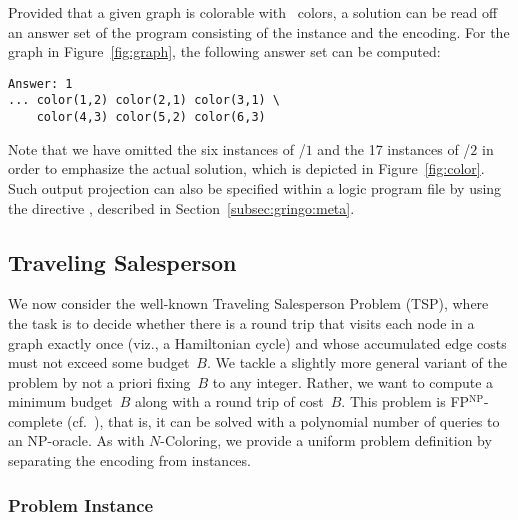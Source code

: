 Provided that a given graph is colorable with~ colors,
a solution can be read off an answer set of the program consisting
of the instance and the encoding.
For the graph in Figure~\ref{fig:graph},
the following answer set can be computed:%
%
\begin{lstlisting}[numbers=none]
Answer: 1
... color(1,2) color(2,1) color(3,1) \
    color(4,3) color(5,2) color(6,3)
\end{lstlisting}
%
Note that we have omitted the six instances of /$1$ and the
17 instances of \pred{edge}/$2$ in order to emphasize the actual solution,
which is depicted in Figure~\ref{fig:color}.
Such output projection can also be specified within a logic program file by
using the directive \code{\#show},
described in Section~\ref{subsec:gringo:meta}.

\subsection{Traveling Salesperson}\label{subsec:ex:tsp}

We now consider the well-known Traveling Salesperson Problem (TSP),
where the task is to decide whether there is a round trip that visits
each node in a graph exactly once (viz., a Hamiltonian cycle) and whose
accumulated edge costs must not exceed some budget~$B$.
We tackle a slightly more general variant of the problem by not
a priori fixing~$B$ to any integer.
Rather,
we want to compute a minimum budget~$B$ along with a round trip of cost~$B$.
This problem is FP$^\textrm{NP}$-complete (cf.~\cite{papadimitriou94a}),
that is, it can be solved with a polynomial number of queries to an NP-oracle.
As with $N$-Coloring,
we provide a uniform problem definition by separating the encoding from instances.

\subsubsection{Problem Instance}\label{subsec:tsp:instance}



